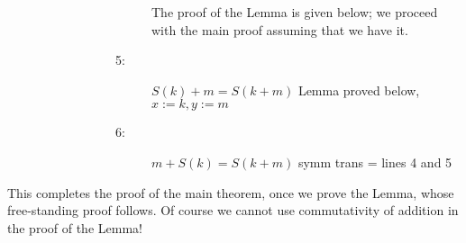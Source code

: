 \documentclass[12pt]{book}
\begin{document}
\begin{description}
\begin{description}
\begin{description}
\begin{description}
The proof of the Lemma is given below; we proceed with the main proof assuming that we have it.

\item[5:]  $S(k)+m = S(k+m)$  Lemma proved below, $x:=k, y:=m$

\item[6:] $m+S(k)=S(k+m)$  symm trans = lines 4 and 5

\end{description}


\end{description}

\end{description}

\end{description}

This completes the proof of the main theorem, once we prove the Lemma, whose free-standing proof follows.
Of course we cannot use commutativity of addition in the proof of the Lemma!
\end{document}
